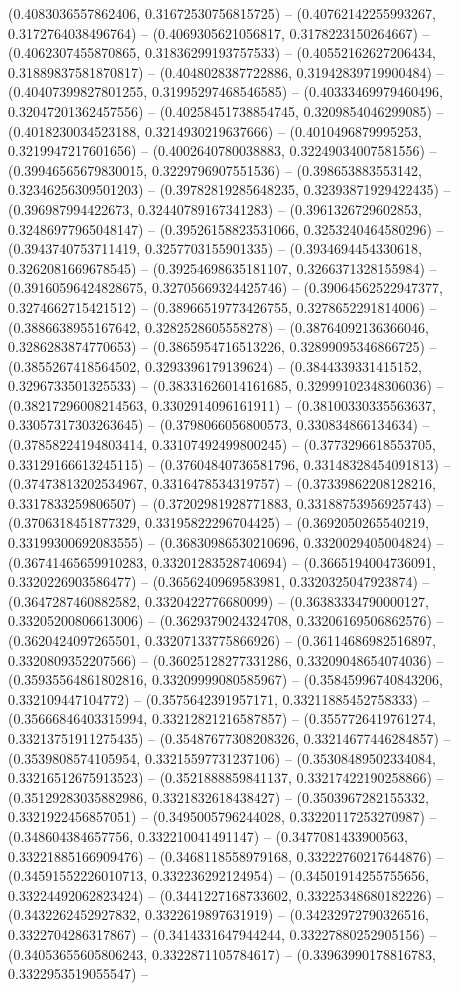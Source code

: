 (0.4083036557862406, 0.31672530756815725) -- (0.40762142255993267, 0.3172764038496764) -- (0.4069305621056817, 0.3178223150264667) -- (0.4062307455870865, 0.31836299193757533) -- (0.40552162627206434, 0.31889837581870817) -- (0.4048028387722886, 0.31942839719900484) -- (0.40407399827801255, 0.31995297468546585) -- (0.40333469979460496, 0.32047201362457556) -- (0.40258451738854745, 0.3209854046299085) -- (0.4018230034523188, 0.3214930219637666) -- (0.4010496879995253, 0.3219947217601656) -- (0.4002640780038883, 0.32249034007581556) -- (0.39946565679830015, 0.3229796907551536) -- (0.398653883553142, 0.32346256309501203) -- (0.39782819285648235, 0.32393871929422435) -- (0.396987994422673, 0.32440789167341283) -- (0.3961326729602853, 0.32486977965048147) -- (0.39526158823531066, 0.3253240464580296) -- (0.3943740753711419, 0.3257703155901335) -- (0.3934694454330618, 0.3262081669678545) -- (0.39254698635181107, 0.3266371328155984) -- (0.39160596424828675, 0.32705669324425746) -- (0.39064562522947377, 0.3274662715421512) -- (0.38966519773426755, 0.3278652291814006) -- (0.3886638955167642, 0.3282528605558278) -- (0.38764092136366046, 0.3286283874770653) -- (0.3865954716513226, 0.32899095346866725) -- (0.3855267418564502, 0.3293396179139624) -- (0.3844339331415152, 0.3296733501325533) -- (0.38331626014161685, 0.32999102348306036) -- (0.38217296008214563, 0.3302914096161911) -- (0.38100330335563637, 0.33057317303263645) -- (0.3798066056800573, 0.330834866134634) -- (0.37858224194803414, 0.33107492499800245) -- (0.3773296618553705, 0.33129166613245115) -- (0.37604840736581796, 0.33148328454091813) -- (0.37473813202534967, 0.3316478534319757) -- (0.37339862208128216, 0.3317833259806507) -- (0.37202981928771883, 0.33188753956925743) -- (0.3706318451877329, 0.33195822296704425) -- (0.3692050265540219, 0.33199300692083555) -- (0.36830986530210696, 0.3320029405004824) -- (0.36741465659910283, 0.33201283528740694) -- (0.3665194004736091, 0.3320226903586477) -- (0.3656240969583981, 0.3320325047923874) -- (0.3647287460882582, 0.3320422776680099) -- (0.36383334790000127, 0.33205200806613006) -- (0.3629379024324708, 0.33206169506862576) -- (0.3620424097265501, 0.33207133775866926) -- (0.36114686982516897, 0.3320809352207566) -- (0.36025128277331286, 0.33209048654074036) -- (0.35935564861802816, 0.33209999080585967) -- (0.35845996740843206, 0.332109447104772) -- (0.3575642391957171, 0.33211885452758333) -- (0.35666846403315994, 0.33212821216587857) -- (0.3557726419761274, 0.33213751911275435) -- (0.35487677308208326, 0.33214677446284857) -- (0.3539808574105954, 0.33215597731237106) -- (0.35308489502334084, 0.33216512675913523) -- (0.3521888859841137, 0.33217422190258866) -- (0.35129283035882986, 0.3321832618438427) -- (0.3503967282155332, 0.3321922456857051) -- (0.3495005796244028, 0.33220117253270987) -- (0.348604384657756, 0.332210041491147) -- (0.3477081433900563, 0.33221885166909476) -- (0.3468118558979168, 0.33222760217644876) -- (0.34591552226010713, 0.332236292124954) -- (0.34501914255755656, 0.33224492062823424) -- (0.3441227168733602, 0.33225348680182226) -- (0.3432262452927832, 0.3322619897631919) -- (0.34232972790326516, 0.3322704286317867) -- (0.3414331647944244, 0.33227880252905156) -- (0.34053655605806243, 0.3322871105784617) -- (0.33963990178816783, 0.3322953519055547) -- 